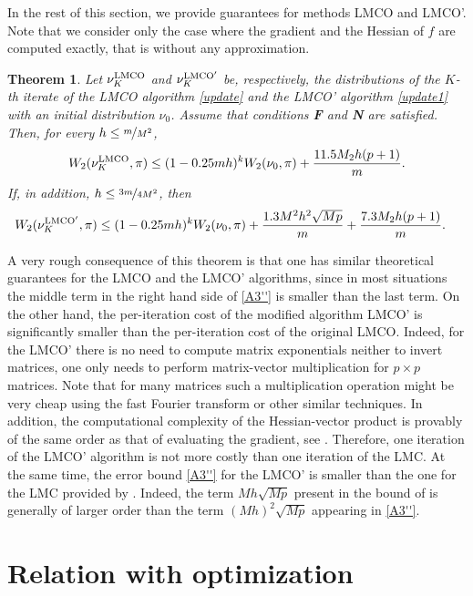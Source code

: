 \documentclass[aoap,preprint,reqno,a4paper]{imsart} %
\newtheorem{theorem}{Theorem}
\begin{document}
In the rest of this section,
we provide guarantees for methods LMCO and LMCO'. Note that we consider
only the case where the gradient and the Hessian of $f$ are computed exactly, that is without any approximation.

\begin{theorem}\label{thFive}
Let $\nu_K^{\rm LMCO}$ and $\nu_K^{\rm LMCO'}$ be, respectively, the distributions of the $K$-th iterate of the LMCO
algorithm \eqref{update} and  the  LMCO' algorithm \eqref{update1} with an initial distribution $\nu_0$.
Assume that conditions {\bf F}  and {\bf N} are  satisfied. Then, for every  $h\le \nicefrac{m}{M^2}$,
\begin{align}\label{A3'}
W_2(\nu_K^{\rm LMCO}, \pi) \le (1-0.25mh)^kW_2(\nu_{0},\pi)+ \frac{11.5 M_2h(p+1)}{m}.		
\end{align}
If, in addition, $h\le \nicefrac{3m}{4M^2}$, then
\begin{align}\label{A3''}
W_2(\nu_K^{\rm LMCO'}, \pi) &\le (1-0.25mh)^kW_2(\nu_{0},\pi)+
\frac{1.3M^2h^2\sqrt{Mp}}{m}+ \frac{7.3 M_2h(p+1)}{m}.
\end{align}
\end{theorem}

A very rough consequence of this theorem is that one has similar theoretical guarantees for
the LMCO and the LMCO' algorithms, since in most situations the middle term in the right hand side
of \eqref{A3''} is smaller than the last term. On the other hand, the per-iteration cost of the
modified algorithm LMCO' is significantly smaller than the per-iteration cost of the original LMCO.
Indeed, for the LMCO' there is no need to compute matrix exponentials neither to invert matrices,
one only needs to perform  matrix-vector multiplication for $p\times p$ matrices. Note that for many
matrices such a multiplication operation might be very cheap using the fast Fourier transform or
other similar techniques. In addition, the computational complexity of the Hessian-vector product
is provably of the same order as that of evaluating the gradient, see \citep{Griewank}. Therefore,
one iteration of the LMCO' algorithm is not more costly than one iteration of the LMC. At the same
time, the error bound \eqref{A3''} for the LMCO' is smaller than the one for the LMC provided by
. Indeed, the term $Mh\sqrt{Mp}$ present in the bound of  is generally
of larger order than the term $(Mh)^2\sqrt{Mp}$ appearing in \eqref{A3''}.



\section{Relation with optimization}
\label{secOpt}
\end{document}
